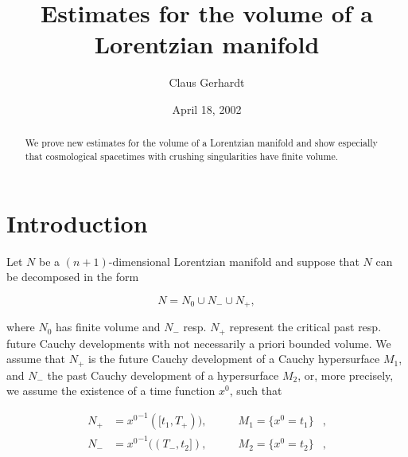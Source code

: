 \documentclass[ a4paper, oneside]{amsart}
\newcommand{\uu}{\cup}
\newcommand{\qq}{\qquad}
\newcommand\nd{\noindent}
\newcommand\cvm{\vspace\Cmedskipamount}
\newcommand\cvb{\vspace\Cbigskipamount}
\newcommand{\lae}[1]{\label{E:#1}}
\theoremstyle{plain}
\theoremstyle{definition}
\theoremstyle{remark}
\numberwithin{equation}{section}
\begin{document}
\title{Estimates for the volume of a Lorentzian manifold}

\author{Claus Gerhardt}
\address{Ruprecht-Karls-Universit\"at, Institut f\"ur Angewandte Mathematik,
Im Neuenheimer Feld 294, 69120 Heidelberg, Germany}

%
\date{April 18, 2002}
%


\begin{abstract} We prove new estimates for the volume of a Lorentzian
mani\-fold and show especially that cosmological spacetimes with crushing
singularities have finite volume.
\end{abstract}
\maketitle
\thispagestyle{empty}

\setcounter{section}{-1}
\section{Introduction} 

\cvb
Let $N$ be a  $(n+1)$-dimensional Lorentzian manifold and suppose that $N$ can be
decomposed in the form

\begin{equation}\lae{0.1}
N=N_0\uu N_-\uu N_+,
\end{equation}

\cvm 
\nd where $N_0$ has finite volume and $N_-$ resp. $N_+$ represent the critical
past resp. future Cauchy developments with not necessarily a priori bounded
volume. We assume that $N_+$ is the future Cauchy development of a Cauchy
hypersurface $M_1$, and $N_-$ the past Cauchy development of a hypersurface
$M_2$, or, more precisely, we assume the existence of a time function $x^0$,
such that

\begin{equation}
\begin{aligned}
N_+&={x^0}^{-1}([t_1,T_+)),&\qq M_1=\{x^0=t_1\}&,\\
N_-&={x^0}^{-1}((T_-,t_2]),&\qq M_2=\{x^0=t_2\}&,
\end{aligned}
\end{equation}
\end{document}

